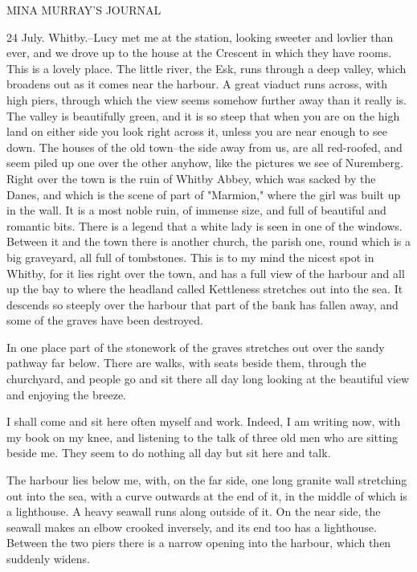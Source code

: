MINA MURRAY'S JOURNAL 

24 July. Whitby.--Lucy met me at the station, looking sweeter and lovlier than ever, and we drove up to the house at the Crescent in which they have rooms. This is a lovely place. The little river, the Esk, runs through a deep valley, which broadens out as it comes near the harbour. A great viaduct runs across, with high piers, through which the view seems somehow further away than it really is. The valley is beautifully green, and it is so steep that when you are on the high land on either side you look right across it, unless you are near enough to see down. The houses of the old town--the side away from us, are all red-roofed, and seem piled up one over the other anyhow, like the pictures we see of Nuremberg. Right over the town is the ruin of Whitby Abbey, which was sacked by the Danes, and which is the scene of part of "Marmion," where the girl was built up in the wall. It is a most noble ruin, of immense size, and full of beautiful and romantic bits. There is a legend that a white lady is seen in one of the windows. Between it and the town there is another church, the parish one, round which is a big graveyard, all full of tombstones. This is to my mind the nicest spot in Whitby, for it lies right over the town, and has a full view of the harbour and all up the bay to where the headland called Kettleness stretches out into the sea. It descends so steeply over the harbour that part of the bank has fallen away, and some of the graves have been destroyed. 

In one place part of the stonework of the graves stretches out over the sandy pathway far below. There are walks, with seats beside them, through the churchyard, and people go and sit there all day long looking at the beautiful view and enjoying the breeze. 

I shall come and sit here often myself and work. Indeed, I am writing now, with my book on my knee, and listening to the talk of three old men who are sitting beside me. They seem to do nothing all day but sit here and talk. 

The harbour lies below me, with, on the far side, one long granite wall stretching out into the sea, with a curve outwards at the end of it, in the middle of which is a lighthouse. A heavy seawall runs along outside of it. On the near side, the seawall makes an elbow crooked inversely, and its end too has a lighthouse. Between the two piers there is a narrow opening into the harbour, which then suddenly widens. 

